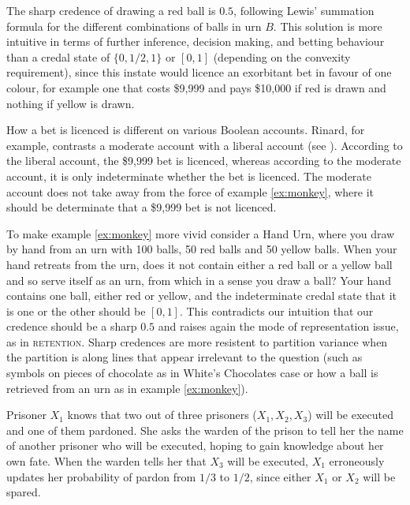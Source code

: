 \documentclass[12pt]{article}
\begin{document}
The sharp credence of drawing a red ball is $0.5$, following Lewis'
summation formula for the different combinations of balls in urn $B$.
This solution is more intuitive in terms of further inference,
decision making, and betting behaviour than a credal state of
$\{0,1/2,1\}$ or $[0,1]$ (depending on the convexity requirement),
since this instate would licence an exorbitant bet in favour of one
colour, for example one that costs \$9,999 and pays \$10,000 if red is
drawn and nothing if yellow is drawn. 

How a bet is licenced is different on various Boolean accounts.
Rinard, for example, contrasts a moderate account with a liberal
account (see ). According to the liberal
account, the \$9,999 bet is licenced, whereas according to the
moderate account, it is only indeterminate whether the bet is
licenced. The moderate account does not take away from the force of
example \ref{ex:monkey}, where it should be determinate that a \$9,999
bet is not licenced.

To make example \ref{ex:monkey} more vivid consider a Hand Urn, where
you draw by hand from an urn with 100 balls, 50 red balls and 50
yellow balls. When your hand retreats from the urn, does it not
contain either a red ball or a yellow ball and so serve itself as an
urn, from which in a sense you draw a ball? Your hand contains one
ball, either red or yellow, and the indeterminate credal state that it
is one or the other should be $[0,1]$. This contradicts our intuition
that our credence should be a sharp $0.5$ and raises again the mode of
representation issue, as in \textsc{retention}. Sharp credences are
more resistent to partition variance when the partition is along lines
that appear irrelevant to the question (such as symbols on pieces of
chocolate as in White's Chocolates case or how a ball is retrieved
from an urn as in example \ref{ex:monkey}).

\begin{quotex}
  \label{ex:threepris} Prisoner $X_{1}$
  knows that two out of three prisoners ($X_{1},X_{2},X_{3}$) will be
  executed and one of them pardoned. She asks the warden of the prison
  to tell her the name of another prisoner who will be executed,
  hoping to gain knowledge about her own fate. When the warden tells
  her that $X_{3}$ will be executed, $X_{1}$ erroneously updates her
  probability of pardon from $1/3$ to $1/2$, since either $X_{1}$ or
  $X_{2}$ will be spared.
\end{quotex}
\end{document}
